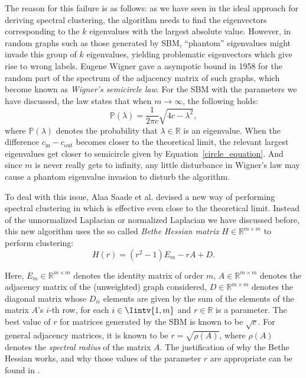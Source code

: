 The reason for this failure is as follows: as we have seen in the ideal approach for deriving spectral clustering, the algorithm needs to find the eigenvectors corresponding to the $k$ eigenvalues with the largest absolute value.
However, in random graphs such as those generated by SBM, ``phantom'' eigenvalues might invade this group of $k$ eigenvalues, yielding problematic eigenvectors which give rise to wrong labels.
Eugene Wigner gave a asympotic bound in 1958 \cite{circle} for the random part of the spectrum of the adjacency matrix of such graphs, which become known as \textit{Wigner's semicircle law}. 
For the SBM with the parameters we have discussed, the law states that when $m \rightarrow \infty$, the following holds:
\begin{equation} \label{circle_equation}
   \mathbb P (\lambda) = \frac{1}{2 \pi c} \sqrt{4c - \lambda^2},
\end{equation}
where $\mathbb P (\lambda)$ denotes the probability that $\lambda \in \mathbb R$ is an eigenvalue.
When the difference $c_\text{in} - c_\text{out}$ becomes closer to the theoretical limit, the relevant largest eigenvalues get closer to semicircle given by Equation~\vref{circle_equation}.
And since $m$ is never really gets to infinity, any little disturbance in Wigner's law may cause a phantom eigenvalue invasion to disturb the algorithm.

To deal with this issue, Alaa Saade et al. devised a new way of performing spectral clustering in \cite{bethe} which is effective even close to the theoretical limit. 
Instead of the unnormalized Laplacian or normalized Laplacian we have discussed before, this new algorithm uses the so called \textit{Bethe Hessian matrix} $H \in \mathbb R ^{m \times m}$ to perform clustering:
\begin{equation}\label{bethe_definition}
   H(r) = (r^2 - 1) E_m -r A + D.
\end{equation}

Here, $E_m \in \mathbb R^{m \times m}$ denotes the identity matrix of order $m$, $A \in \mathbb R^{m \times m}$ denotes the adjacency matrix of the (unweighted) graph considered, $D \in \mathbb R^{m \times m}$ denotes the diagonal matrix whose $D_{ii}$ elements are given by the sum of the elements of the matrix $A$'s $i$-th row, for each $i \in \Iintv{1,m}$ and $r \in \mathbb R$ is a parameter.
The best value of $r$ for matrices generated by the SBM is known to be $\sqrt{c}$.
For general adjacency matrices, it is known to be $r = \sqrt{\rho {(A)}}$, where $\rho (A)$ denotes the \textit{spectral radius} of the matrix $A$.
The justification of why the Bethe Hessian works, and why those values of the parameter $r$ are appropriate can be found in \cite{bethe}.

